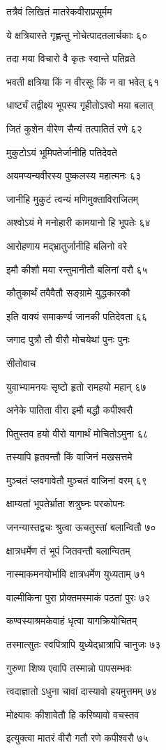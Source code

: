 तत्रैवं लिखितं मातरेकवीराप्रसूर्मम

ये क्षत्रियास्ते गृह्णन्तु नोचेत्पादतलार्चकाः ६०

तदा मया विचारो वै कृतः स्वान्ते पतिव्रते

भवती क्षत्रिया किं न वीरसूः किं न वा भवेत् ६१

धार्ष्ट्यं तद्वीक्ष्य भूपस्य गृहीतोऽश्वो मया बलात्

जितं कुशेन वीरेण सैन्यं तत्पातितं रणे ६२

मुकुटोऽयं भूमिपतेर्जानीहि पतिदेवते

अयमप्यन्यवीरस्य पुष्कलस्य महात्मनः ६३

जानीहि मुकुटं त्वन्यं मणिमुक्ताविराजितम्

अश्वोऽयं मे मनोहारी कामयानो हि भूपतेः ६४

आरोहणाय मद्भ्रातुर्जानीहि बलिनो वरे

इमौ कीशौ मया रन्तुमानीतौ बलिनां वरौ ६५

कौतुकार्थं तवैवैतौ सङ्ग्रामे युद्धकारकौ

इति वाक्यं समाकर्ण्य जानकी पतिदेवता ६६

जगाद पुत्रौ तौ वीरौ मोचयेथां पुनः पुनः

सीतोवाच

युवाभ्यामनयः सृष्टो हृतो रामहयो महान् ६७

अनेके पातिता वीरा इमौ बद्धौ कपीश्वरौ

पितुस्तव हयो वीरो यागार्थं मोचितोऽमुना ६८

तस्यापि हृतवन्तौ किं वाजिनं मखसत्तमे

मुञ्चतं प्लवगावेतौ मुञ्चतं वाजिनां वरम् ६९

क्षाम्यतां भूपतेर्भ्राता शत्रुघ्नः परकोपनः

जनन्यास्तद्वचः श्रुत्वा ऊचतुस्तां बलान्वितौ ७०

क्षात्रधर्मेण तं भूपं जितवन्तौ बलान्वितम्

नास्माकमनयोर्भावि क्षात्रधर्मेण युध्यताम् ७१

वाल्मीकिना पुरा प्रोक्तमस्माकं पठतां पुरः ७२

कण्वस्याश्रमकेवाहं धृत्वा यागक्रियोचितम्

तस्मात्सुतः स्वपित्रापि युध्येद्भ्रात्रापि चानुजः ७३

गुरुणा शिष्य एवापि तस्मान्नो पापसम्भवः

त्वदाज्ञातो ऽधुना चावां दास्यावो हयमुत्तमम् ७४

मोक्ष्यावः कीशावेतौ हि करिष्यावो वचस्तव

इत्युक्त्वा मातरं वीरौ गतौ रणे कपीश्वरौ ७५

